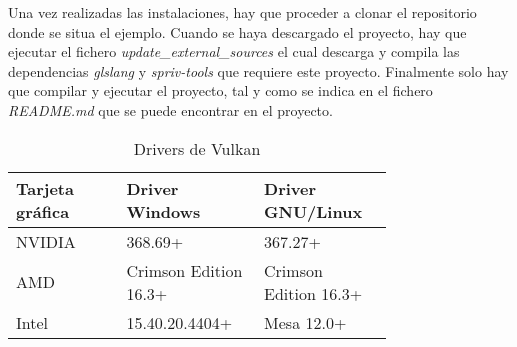 Una vez realizadas las instalaciones, hay que proceder a clonar el repositorio donde se situa el ejemplo. Cuando se
haya descargado el proyecto, hay que ejecutar el fichero \emph{update\_external\_sources} el cual descarga y compila
las dependencias \emph{glslang} y \emph{spriv-tools} que requiere este proyecto. Finalmente solo hay que compilar
y ejecutar el proyecto, tal y como se indica en el fichero \emph{README.md} que se puede encontrar en el proyecto.

\begin{table*}[t]
  \centering
  \begin{tabular}{p{0.25\linewidth}p{0.25\linewidth}p{0.25\linewidth}}
    \toprule
    Tarjeta gráfica & Driver Windows    & Driver GNU/Linux \\
    \midrule
    NVIDIA          & 368.69+                   & 367.27+ \\
    AMD             & Crimson Edition 16.3+     & Crimson Edition 16.3+ \\
    Intel           & 15.40.20.4404+            & Mesa 12.0+ \\
    \bottomrule
  \end{tabular}
  \caption{Drivers de Vulkan}
  \label{tab:vulkan_drivers}
\end{table*}
